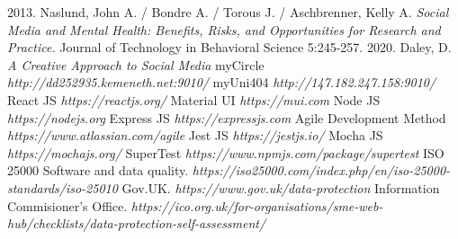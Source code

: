 \documentclass[lettersize,journal]{IEEEtran}
\begin{document}
\begin{thebibliography}{}
        2013.
        Naslund, John A. / Bondre A. / Torous J. / Aschbrenner, Kelly A. {\it{Social Media and Mental Health: Benefits, Risks, and Opportunities for Research and Practice.}} Journal of Technology in Behavioral Science 5:245-257.
        2020.
        Daley, D. {\it{A Creative Approach to Social Media}}
        myCircle
        {\it{http://dd252935.kemeneth.net:9010/}}
    myUni404
    {\it{http://147.182.247.158:9010/}}
        React JS
        {\it{https://reactjs.org/}}
        Material UI
        {\it{https://mui.com}}
        Node JS
        {\it{https://nodejs.org}}
        Express JS
        {\it{https://expressjs.com}}
        Agile Development Method
        {\it{https://www.atlassian.com/agile}}
        Jest JS
        {\it{https://jestjs.io/}}
        Mocha JS
        {\it{https://mochajs.org/}}
        SuperTest
        {\it{https://www.npmjs.com/package/supertest}}
        ISO 25000 Software and data quality.
        {\it{https://iso25000.com/index.php/en/iso-25000-standards/iso-25010}}
        Gov.UK. {\it{https://www.gov.uk/data-protection}}
        Information Commisioner's Office. {\it{https://ico.org.uk/for-organisations/sme-web-hub/checklists/data-protection-self-assessment/}}

\end{thebibliography}





\vspace{11pt}


\vspace{11pt}


\vfill
\end{document}
